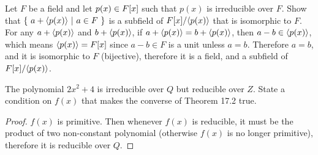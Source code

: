 \documentclass[../main.tex]{subfiles}
\begin{document}
\setcounter{exercise}{40}
\begin{exercise}
  Let $F$ be a field and let $p(x) \in F[x]$ such that $p(x)$ is irreducible over $F$.
  Show that $\{ \ a + \langle p(x) \rangle \ | \ a \in F \ \}$ is a subfield of $F[x]/\langle p(x) \rangle$
  that is isomorphic to $F$.
  For any $a + \langle p(x) \rangle$ and $b + \langle p(x) \rangle$, if $a + \langle p(x) \rangle = b + \langle p(x) \rangle$,
  then $a - b \in \langle p(x) \rangle$, which means $\langle p(x) \rangle = F[x]$ since $a - b \in F$ is a unit
  unless $a = b$. Therefore $a = b$, and it is isomorphic to $F$ (bijective), therefore
  it is a field, and a subfield of $F[x]/\langle p(x) \rangle$.
\end{exercise}

\setcounter{exercise}{42}
\begin{exercise}
  The polynomial $2x^2 + 4$ is irreducible over $Q$ but reducible over $Z$.
  State a condition on $f(x)$ that makes the converse of Theorem 17.2 true.
\end{exercise}
\begin{proof}
  $f(x)$ is primitive. Then whenever $f(x)$ is reducible, it must be the
  product of two non-constant polynomial (otherwise $f(x)$ is no longer primitive),
  therefore it is reducible over $Q$.
\end{proof}
\end{document}
